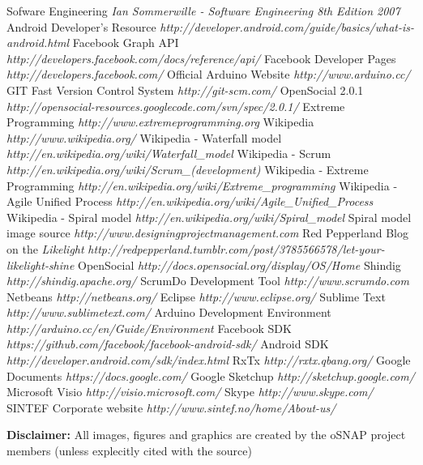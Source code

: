 \begin{thebibliography}{99}
 Sofware Engineering {\em Ian Sommerwille - Software Engineering 8th Edition 2007}
 Android Developer's Resource  {\em http://developer.android.com/guide/basics/what-is-android.html}
 Facebook Graph API {\em http://developers.facebook.com/docs/reference/api/}
 Facebook Developer Pages {\em http://developers.facebook.com/}
 Official Arduino Website {\em http://www.arduino.cc/}
 GIT Fast Version Control System {\em http://git-scm.com/}
 OpenSocial 2.0.1 {\em http://opensocial-resources.googlecode.com/svn/spec/2.0.1/}
 Extreme Programming {\em http://www.extremeprogramming.org}
 Wikipedia {\em http://www.wikipedia.org/}
 Wikipedia - Waterfall model {\em http://en.wikipedia.org/wiki/Waterfall\_model}
 Wikipedia - Scrum {\em http://en.wikipedia.org/wiki/Scrum\_(development)}
 Wikipedia - Extreme Programming {\em http://en.wikipedia.org/wiki/Extreme\_programming}
 Wikipedia - Agile Unified Process {\em http://en.wikipedia.org/wiki/Agile\_Unified\_Process}
 Wikipedia - Spiral model {\em http://en.wikipedia.org/wiki/Spiral\_model}
 Spiral model image source {\em http://www.designingprojectmanagement.com}
 Red Pepperland Blog on the \emph{Likelight} {\em http://redpepperland.tumblr.com/post/3785566578/let-your-likelight-shine}
 OpenSocial {\em http://docs.opensocial.org/display/OS/Home}
 Shindig {\em http://shindig.apache.org/}
 ScrumDo Development Tool {\em http://www.scrumdo.com}
 Netbeans {\em http://netbeans.org/}
 Eclipse {\em http://www.eclipse.org/}
 Sublime Text {\em http://www.sublimetext.com/}
 Arduino Development Environment {\em http://arduino.cc/en/Guide/Environment}
 Facebook SDK {\em https://github.com/facebook/facebook-android-sdk/}
 Android SDK {\em http://developer.android.com/sdk/index.html}
 RxTx {\em http://rxtx.qbang.org/}
 Google Documents {\em https://docs.google.com/}
 Google Sketchup {\em http://sketchup.google.com/}
 Microsoft Visio {\em http://visio.microsoft.com/}
 Skype {\em http://www.skype.com/}
 SINTEF Corporate website {\em http://www.sintef.no/home/About-us/}
\end{thebibliography}


\textbf{Disclaimer:}
All images, figures and graphics are created by the oSNAP project members (unless explecitly cited with the source)
